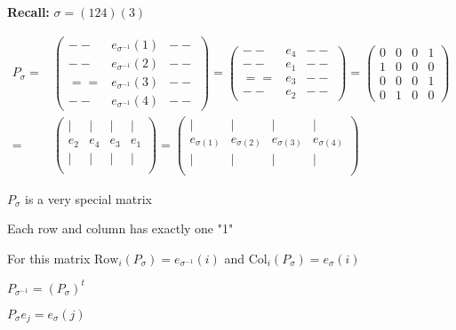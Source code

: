 \documentclass[12pt]{article}
\newcommand{\Col}{\mathrm{Col}}
\newcommand{\Row}{\mathrm{Row}}
\begin{document}
{\color{Brown}
	\textbf{Recall: }$\sigma = (1 2 4)(3)$

	\begin{align*}
		P_{\sigma} =& 
		\begin{pmatrix}
			-- & e_{\sigma^{-1}}(1) & --	\\
			-- & e_{\sigma^{-1}}(2) & --	\\
			== & e_{\sigma^{-1}}(3) & --	\\
			-- & e_{\sigma^{-1}}(4) & -- 
		\end{pmatrix}
		= 
		\begin{pmatrix}
			-- & e_4 & --	\\
			-- & e_1 & --	\\
			== & e_3 & --	\\
			-- & e_2 & --
		\end{pmatrix}
		= 
		\begin{pmatrix}
			0 & 0 & 0 & 1	\\
			1 & 0 & 0 & 0	\\
			0 & 0 & 0 & 1	\\
			0 & 1 & 0 & 0
		\end{pmatrix}\\
		= &
		\begin{pmatrix}
			| & | & | & |	\\
			e_2 & e_4 & e_3 & e_1	\\
			| & | & | & |	\\
		\end{pmatrix}
		= 
		\begin{pmatrix}
			| & | & | & |	\\
			e_{\sigma(1)} & e_{\sigma(2)} & e_{\sigma(3)} & e_{\sigma(4)}	\\
			| & | & | & |	\\
		\end{pmatrix}
	\end{align*}
}
\begin{description}
	\item $P_{\sigma}$ is a very special matrix
	\item Each row and column has exactly one "1"
	\item For this matrix $\Row_i(P_{\sigma}) = e_{\sigma^{-1}}(i)$
		and $\Col_i(P_{\sigma}) = e_{\sigma}(i)$
	\item $P_{\sigma^{-1}} = (P_{\sigma})^t$
	\item $P_{\sigma} e_j = e_{\sigma}(j)$
\end{description}
\end{document}
